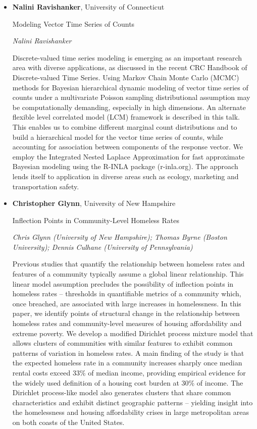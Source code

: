 \begin{itemize}
\item \textbf{Nalini Ravishanker}, University of Connecticut

Modeling Vector Time Series of Counts

\emph{\footnotesize Nalini Ravishanker}

Discrete-valued time series modeling is emerging as an important research area with diverse applications, as discussed in the recent CRC Handbook of Discrete-valued Time Series. Using Markov Chain Monte Carlo (MCMC) methods for Bayesian hierarchical dynamic modeling of vector time series of counts under a multivariate Poisson sampling distributional assumption may be computationally demanding, especially in high dimensions.  An alternate flexible level correlated model (LCM) framework is described in this talk. This enables us to combine different marginal count distributions and to build a hierarchical model for the vector time series of counts, while accounting for association between components of the response vector. We employ the Integrated Nested Laplace Approximation for fast approximate Bayesian modeling using the R-INLA package (r-inla.org). The approach lends itself to application in diverse areas such as ecology, marketing and transportation safety.

\item \textbf{Christopher Glynn}, University of New Hampshire

Inflection Points in Community-Level Homeless Rates

\emph{\footnotesize Chris Glynn (University of New Hampshire); Thomas Byrne (Boston University); Dennis Culhane (University of Pennsylvania)}

Previous studies that quantify the relationship between homeless rates and features of a community typically assume a global linear relationship.  This linear model assumption precludes the possibility of inflection points in homeless rates -- thresholds in quantifiable metrics of a community which, once breached, are associated with large increases in homelessness.  In this paper, we identify points of structural change in the relationship between homeless rates and community-level measures of housing affordability and extreme poverty.  We develop a modified Dirichlet process mixture model that allows clusters of communities with similar features to exhibit common patterns of variation in homeless rates.  A main finding of the study is that the expected homeless rate in a community increases sharply once median rental costs exceed 33\% of median income, providing empirical evidence for the widely used definition of a housing cost burden at 30\% of income.  The Dirichlet process-like model also generates clusters that share common characteristics and exhibit distinct geographic patterns -- yielding insight into the homelessness and housing affordability crises in large metropolitan areas on both coasts of the United States.


\end{itemize}
